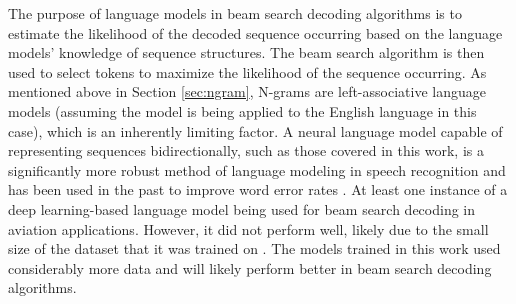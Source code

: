 \documentclass[12pt]{article}
\begin{document}
The purpose of language models in beam search decoding algorithms is to estimate the likelihood of the decoded sequence occurring based on the
language models' knowledge of sequence structures. The beam search algorithm is then used to select tokens to maximize the likelihood of the
sequence occurring. As mentioned above in Section \ref{sec:ngram}, N-grams are left-associative language models (assuming the model is being
applied to the English language in this case), which is an inherently limiting factor. A neural language model capable of representing sequences
bidirectionally, such as those covered in this work, is a significantly more robust method of language modeling in speech recognition and has been
used in the past to improve word error rates \cite{kriman_quartznet_2020,majumdar_citrinet_2021}. At least one instance of a deep learning-based
language model being used for beam search decoding in aviation applications. However, it did not perform well, likely due to the small size of the
dataset that it was trained on \cite{pellegrini_airbus_2019}. The models trained in this work used considerably more data and will likely perform
better in beam search decoding algorithms.

\newpage


\end{document}
